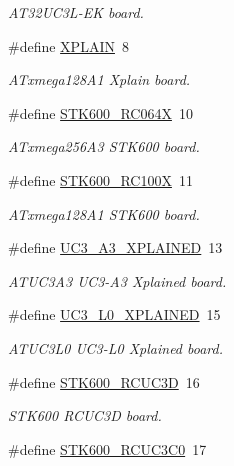 \begin{DoxyCompactItemize}
\begin{DoxyCompactList}\small\item\em A\-T32\-U\-C3\-L-\/\-E\-K board. \end{DoxyCompactList}\item 
\#define \hyperlink{group__group__common__boards_ga5c3d6ea6d4027a39a00ab973ec088853}{X\-P\-L\-A\-I\-N}~8
\begin{DoxyCompactList}\small\item\em A\-Txmega128\-A1 Xplain board. \end{DoxyCompactList}\item 
\#define \hyperlink{group__group__common__boards_ga54d846b1bcede53f8a10bec70bb14b82}{S\-T\-K600\-\_\-\-R\-C064\-X}~10
\begin{DoxyCompactList}\small\item\em A\-Txmega256\-A3 S\-T\-K600 board. \end{DoxyCompactList}\item 
\#define \hyperlink{group__group__common__boards_ga72882e3e8e7a4e04ebf8749f2d995089}{S\-T\-K600\-\_\-\-R\-C100\-X}~11
\begin{DoxyCompactList}\small\item\em A\-Txmega128\-A1 S\-T\-K600 board. \end{DoxyCompactList}\item 
\#define \hyperlink{group__group__common__boards_ga6dba56934e370fd84b3126a71bd356e7}{U\-C3\-\_\-\-A3\-\_\-\-X\-P\-L\-A\-I\-N\-E\-D}~13
\begin{DoxyCompactList}\small\item\em A\-T\-U\-C3\-A3 U\-C3-\/\-A3 Xplained board. \end{DoxyCompactList}\item 
\#define \hyperlink{group__group__common__boards_ga200ef6ece7fd63cb742129efac4a935e}{U\-C3\-\_\-\-L0\-\_\-\-X\-P\-L\-A\-I\-N\-E\-D}~15
\begin{DoxyCompactList}\small\item\em A\-T\-U\-C3\-L0 U\-C3-\/\-L0 Xplained board. \end{DoxyCompactList}\item 
\#define \hyperlink{group__group__common__boards_gaa29dce837106d550e81421fa51e62ce7}{S\-T\-K600\-\_\-\-R\-C\-U\-C3\-D}~16
\begin{DoxyCompactList}\small\item\em S\-T\-K600 R\-C\-U\-C3\-D board. \end{DoxyCompactList}\item 
\#define \hyperlink{group__group__common__boards_ga1316c2c38800ce76bb12e7a76c66bdaf}{S\-T\-K600\-\_\-\-R\-C\-U\-C3\-C0}~17

\end{DoxyCompactItemize}
